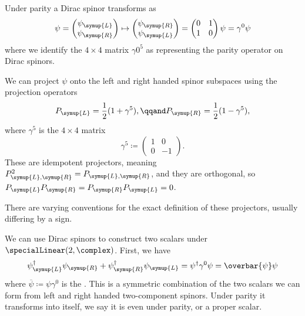 \documentclass[fleqn]{NotesClass}
\newcommand{\ident}{1}
\newcommand{\hermit}{\dagger}
\newcommand{\Left}{\symup{L}}
\newcommand{\Right}{\symup{R}}
\newcommand{\diracadjoint}[1]{\overbar{#1}}
\begin{document}
    Under parity a Dirac spinor transforms as
    \begin{equation}
        \psi = 
        \begin{pmatrix}
            \psi_{\Left}\\ \psi_{\Right}
        \end{pmatrix}
        \mapsto 
        \begin{pmatrix}
            \psi_{\Right}\\ \psi_{\Left}
        \end{pmatrix}
        =
        \begin{pmatrix}
            0 & \ident\\
            \ident & 0
        \end{pmatrix}
        \psi = \gamma^0 \psi
    \end{equation}
    where we identify the \(4 \times 4\) matrix \(\gamma0^5\) as representing the parity operator on Dirac spinors.
    
    We can project \(\psi\) onto the left and right handed spinor subspaces using the projection operators
    \begin{equation}
        P_{\Left} = \frac{1}{2}(1 + \gamma^5), \qqand P_{\Right} = \frac{1}{2}(1 - \gamma^5),
    \end{equation}
    where \(\gamma^5\) is the \(4 \times 4\) matrix
    \begin{equation}
        \gamma^5 \coloneqq 
        \begin{pmatrix}
            \ident & 0\\
            0 & -\ident
        \end{pmatrix}
        .
    \end{equation}
    These are idempotent projectors, meaning \(P_{\Left, \Right}^2 = P_{\Left, \Right}\), and they are orthogonal, so \(P_{\Left} P_{\Right} = P_{\Right} P_{\Left} = 0\).
    \begin{wrn}
        There are varying conventions for the exact definition of these projectors, usually differing by a sign.
    \end{wrn}
    
    We can use Dirac spinors to construct two scalars under \(\specialLinear(2, \complex)\).
    First, we have
    \begin{equation}
        \psi_{\Left}^\hermit \psi_{\Right} + \psi_{\Right}^\hermit \psi_{\Left} = \psi^\hermit \gamma^0 \psi = \diracadjoint{\psi}\psi
    \end{equation}
    where \(\diracadjoint{\psi} \coloneqq \psi\gamma^0\) is the .
    This is a symmetric combination of the two scalars we can form from left and right handed two-component spinors.
    Under parity it transforms into itself, we say it is even under parity, or a proper scalar.
    
\end{document}

